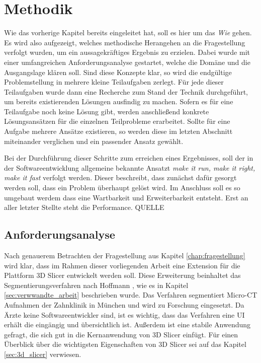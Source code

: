 \chapter{Methodik}
\label{chap:methodik} Wie das vorherige Kapitel bereits eingeleitet hat, soll es
hier um das \textit{Wie} gehen. Es wird also aufgezeigt, welches methodische Herangehen
an die Fragestellung verfolgt wurden, um ein aussagekräftiges Ergebnis zu
erzielen. Dabei wurde mit einer umfangreichen Anforderungsanalyse gestartet,
welche die Domäne und die Ausgangslage klären soll. Sind diese Konzepte klar, so
wird die endgültige Problemstellung in mehrere kleine Teilaufgaben zerlegt. Für jede
dieser Teilaufgaben wurde dann eine Recherche zum Stand der Technik durchgeführt,
um bereits existierenden Lösungen ausfindig zu machen. Sofern es für eine Teilaufgabe
noch keine Lösung gibt, werden anschließend konkrete Lösungsansätzen für die
einzelnen Teilprobleme erarbeitet. Sollte für eine Aufgabe mehrere Ansätze existieren,
so werden diese im letzten Abschnitt miteinander verglichen und ein passender
Ansatz gewählt.

Bei der Durchführung dieser Schritte zum erreichen eines Ergebnisses, soll der in
der Softwareentwicklung allgemeine bekannte Ansatzt \textit{make it run, make it
right, make it fast} verfolgt werden. Dieser beschreibt, dass zunächst dafür
gesorgt werden soll, dass ein Problem überhaupt gelöst wird. Im Anschluss soll
es so umgebaut werdem dass eine Wartbarkeit und Erweiterbarkeit entsteht. Erst an
aller letzter Stellte steht die Performance. QUELLE

\section{Anforderungsanalyse}
\label{sec:anforderungsanalyse} Nach genauerem Betrachten der Fragestellung aus Kapitel
\ref{chap:fragestellung} wird klar, dass im Rahmen dieser vorliegenden Arbeit
eine Extension für die Plattform 3D Slicer entwickelt werden soll. Diese Erweiterung
beinhaltet das Segmentierungsverfahren nach Hoffmann \citep[vgl.][]{hoffmann2020},
wie es in Kapitel \ref{sec:verwwandte_arbeit} beschrieben wurde. Das Verfahren
segmentiert Micro-CT Aufnahmen der Zahnklinik in München und wird zu Forschung
eingesetzt. Da Ärzte keine Softwareentwickler sind, ist es wichtig, dass das Verfahren
eine UI erhält die eingängig und übersichtlich ist. Außerdem ist eine stabile
Anwendung gefragt, die sich gut in die Kernanwendung von 3D Slicer einfügt. Für
einen Überblick über die wichtigsten Eigenschaften von 3D Slicer sei auf das
Kapitel \ref{sec:3d_slicer} verwiesen.

